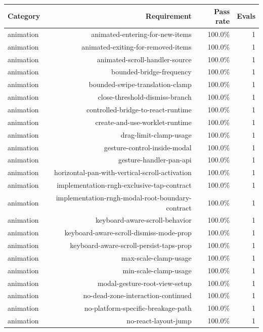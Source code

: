 \begin{table}[htbp]
\centering
\begin{tabular}{lrrr}
\toprule
Category & Requirement & Pass rate & Evals \\
\midrule
animation & animated-entering-for-new-items & 100.0\% & 1 \\
animation & animated-exiting-for-removed-items & 100.0\% & 1 \\
animation & animated-scroll-handler-source & 100.0\% & 1 \\
animation & bounded-bridge-frequency & 100.0\% & 1 \\
animation & bounded-swipe-translation-clamp & 100.0\% & 1 \\
animation & close-threshold-dismiss-branch & 100.0\% & 1 \\
animation & controlled-bridge-to-react-runtime & 100.0\% & 1 \\
animation & create-and-use-worklet-runtime & 100.0\% & 1 \\
animation & drag-limit-clamp-usage & 100.0\% & 1 \\
animation & gesture-control-inside-modal & 100.0\% & 1 \\
animation & gesture-handler-pan-api & 100.0\% & 1 \\
animation & horizontal-pan-with-vertical-scroll-activation & 100.0\% & 1 \\
animation & implementation-rngh-exclusive-tap-contract & 100.0\% & 1 \\
animation & implementation-rngh-modal-root-boundary-contract & 100.0\% & 1 \\
animation & keyboard-aware-scroll-behavior & 100.0\% & 1 \\
animation & keyboard-aware-scroll-dismiss-mode-prop & 100.0\% & 1 \\
animation & keyboard-aware-scroll-persist-taps-prop & 100.0\% & 1 \\
animation & max-scale-clamp-usage & 100.0\% & 1 \\
animation & min-scale-clamp-usage & 100.0\% & 1 \\
animation & modal-gesture-root-view-setup & 100.0\% & 1 \\
animation & no-dead-zone-interaction-continued & 100.0\% & 1 \\
animation & no-platform-specific-breakage-path & 100.0\% & 1 \\
animation & no-react-layout-jump & 100.0\% & 1 \\

\end{tabular}
\end{table}
